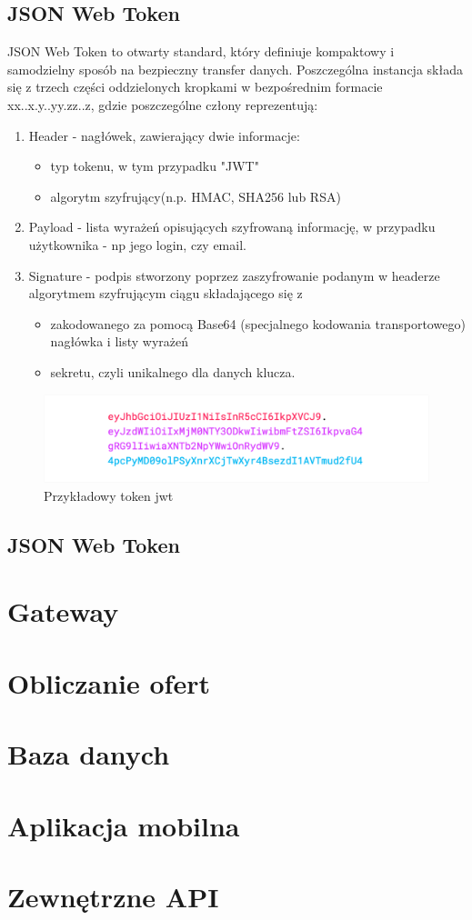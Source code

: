 \subsection{JSON Web Token}

JSON Web Token to otwarty standard, który definiuje kompaktowy i samodzielny sposób na bezpieczny transfer danych. Poszczególna instancja składa się z trzech części oddzielonych kropkami w bezpośrednim formacie xx..x.y..yy.zz..z, gdzie poszczególne człony reprezentują: \cite{jwt}
\begin{enumerate}%
	\item Header - nagłówek, zawierający dwie informacje:
		\begin{itemize}
			\item typ tokenu, w tym przypadku "JWT"
			\item algorytm szyfrujący(n.p. HMAC, SHA256 lub RSA)
		\end{itemize}

	\item Payload - lista wyrażeń opisujących szyfrowaną informację, w przypadku użytkownika - np jego login, czy email.
	
	\item Signature - podpis stworzony poprzez zaszyfrowanie podanym w headerze algorytmem szyfrującym ciągu składającego się z
	\begin{itemize}
		\item zakodowanego za pomocą Base64 (specjalnego kodowania transportowego) nagłówka i listy wyrażeń
		\item sekretu, czyli unikalnego dla danych klucza.
	\end{itemize}
	\end{enumerate}

	\begin{figure}[H]
		\centering
		\includegraphics[width=\linewidth]{json-token.png}
		\caption{Przykładowy token jwt \cite{jwt}}
	\end{figure}

\subsection{JSON Web Token}


\section{Gateway}
\section{Obliczanie ofert}
\section{Baza danych}
\section{Aplikacja mobilna}
\section{Zewnętrzne API}